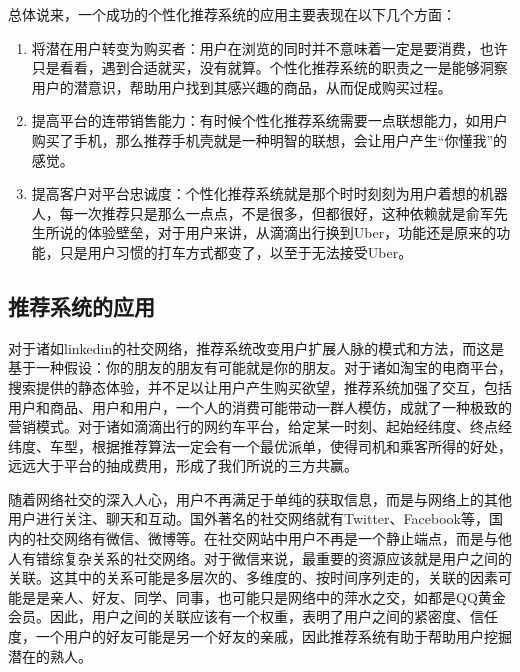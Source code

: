 	总体说来，一个成功的个性化推荐系统的应用主要表现在以下几个方面：
	\begin{enumerate}[(1)]
	\item 将潜在用户转变为购买者：用户在浏览的同时并不意味着一定是要消费，也许只是看看，遇到合适就买，没有就算。个性化推荐系统的职责之一是能够洞察用户的潜意识，帮助用户找到其感兴趣的商品，从而促成购买过程。
	\item 提高平台的连带销售能力：有时候个性化推荐系统需要一点联想能力，如用户购买了手机，那么推荐手机壳就是一种明智的联想，会让用户产生“你懂我”的感觉。
	\item 提高客户对平台忠诚度：个性化推荐系统就是那个时时刻刻为用户着想的机器人，每一次推荐只是那么一点点，不是很多，但都很好，这种依赖就是俞军先生所说的体验壁垒，对于用户来讲，从滴滴出行换到Uber，功能还是原来的功能，只是用户习惯的打车方式都变了，以至于无法接受Uber。
	\end{enumerate}

	\subsection{推荐系统的应用}
	对于诸如linkedin的社交网络，推荐系统改变用户扩展人脉的模式和方法，而这是基于一种假设：你的朋友的朋友有可能就是你的朋友。对于诸如淘宝的电商平台，搜索提供的静态体验，并不足以让用户产生购买欲望，推荐系统加强了交互，包括用户和商品、用户和用户，一个人的消费可能带动一群人模仿，成就了一种极致的营销模式。对于诸如滴滴出行的网约车平台，给定某一时刻、起始经纬度、终点经纬度、车型，根据推荐算法一定会有一个最优派单，使得司机和乘客所得的好处，远远大于平台的抽成费用，形成了我们所说的三方共赢。

	随着网络社交的深入人心，用户不再满足于单纯的获取信息，而是与网络上的其他用户进行关注、聊天和互动。国外著名的社交网络就有Twitter、Facebook等，国内的社交网络有微信、微博等。在社交网站中用户不再是一个静止端点，而是与他人有错综复杂关系的社交网络。对于微信来说，最重要的资源应该就是用户之间的关联。这其中的关系可能是多层次的、多维度的、按时间序列走的，关联的因素可能是是亲人、好友、同学、同事，也可能只是网络中的萍水之交，如都是QQ黄金会员。因此，用户之间的关联应该有一个权重，表明了用户之间的紧密度、信任度，一个用户的好友可能是另一个好友的亲戚，因此推荐系统有助于帮助用户挖掘潜在的熟人。

